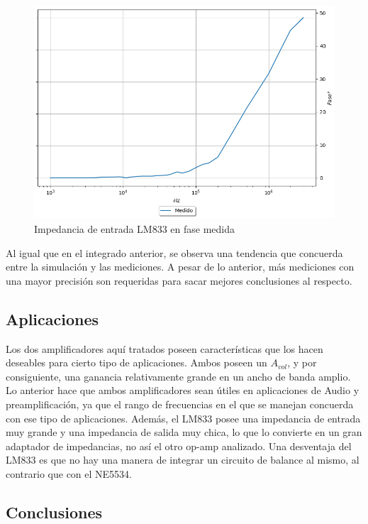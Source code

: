 \begin{figure}[H]	
	\centering
	\includegraphics[width=\textwidth]{Ejercicio2/Imagenes/Zin_F_NE5534_Medido.png}
	\caption{Impedancia de entrada LM833 en fase medida}
\end{figure}

Al igual que en el integrado anterior, se observa una tendencia que concuerda entre la simulación y las mediciones. A pesar de lo anterior, más mediciones con una mayor precisión son requeridas para sacar mejores conclusiones al respecto.
\subsection{Aplicaciones}
Los dos amplificadores aquí tratados poseen características que los hacen deseables para cierto tipo de aplicaciones. Ambos poseen un $A_{vol}$, y por consiguiente, una ganancia relativamente grande en un ancho de banda amplio. Lo anterior hace que ambos amplificadores sean útiles en aplicaciones de Audio y preamplificación, ya que el rango de frecuencias en el que se manejan concuerda con ese tipo de aplicaciones. Además, el LM833 posee una impedancia de entrada muy grande y una impedancia de salida muy chica, lo que lo convierte en un gran adaptador de impedancias, no así el otro op-amp analizado. Una desventaja del LM833 es que no hay una manera de integrar un circuito de balance al mismo, al contrario que con el NE5534. 


\subsection{Conclusiones}

